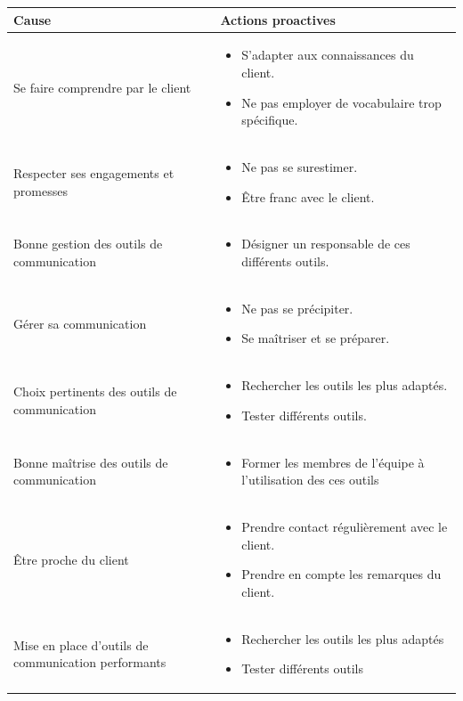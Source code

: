 {\centering
	\begin{longtable}{|p{7cm}|p{7cm}|}
	\hline
	\rowcolor{gray!40} Cause & Actions proactives \\
	\hline
	 Se faire comprendre par le client & \begin{itemize}
	 	\item S'adapter aux connaissances du client.
	 	\item Ne pas employer de vocabulaire trop spécifique.
	 \end{itemize} \\
	\hline
	Respecter ses engagements et promesses & \begin{itemize}
		\item Ne pas se surestimer.
		\item Être franc avec le client.
	\end{itemize} \\
	\hline
	Bonne gestion des outils de communication & \begin{itemize}
		\item Désigner un responsable de ces différents outils.
	\end{itemize} \\
	\hline
	Gérer sa communication & \begin{itemize}
		\item Ne pas se précipiter.
		\item Se maîtriser et se préparer.
	\end{itemize} \\
	\hline
	Choix pertinents des outils de communication & \begin{itemize}
		\item Rechercher les outils les plus adaptés.
		\item Tester différents outils.
	\end{itemize} \\
	\hline
	Bonne maîtrise des outils de communication & \begin{itemize}
		\item Former les membres de l'équipe à l'utilisation des ces outils
	\end{itemize} \\
	\hline
	Être proche du client & \begin{itemize}
		\item Prendre contact régulièrement avec le client.
		\item Prendre en compte les remarques du client.
	\end{itemize} \\
	\hline
	Mise en place d'outils de communication performants & \begin{itemize}
		\item Rechercher les outils les plus adaptés
		\item Tester différents outils
	\end{itemize} \\
	\hline
	\end{longtable}}

